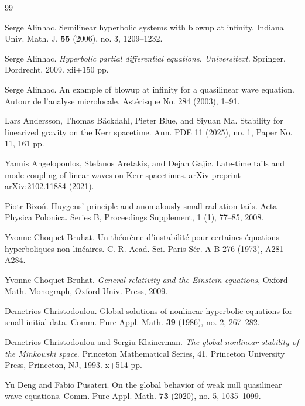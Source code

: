 \documentclass[a4paper,reqno]{amsart}
\theoremstyle{definition}
\numberwithin{equation}{section}
\begin{document}
\begin{thebibliography}{99}

 Serge Alinhac.
	Semilinear hyperbolic systems with blowup at infinity. 
	Indiana Univ. Math. J. \textbf{55} (2006), no. 3, 1209–1232.

 Serge Alinhac.
\emph{Hyperbolic partial differential equations. Universitext.}
Springer, Dordrecht, 2009. xii+150 pp. 

 Serge Alinhac.  
An example of blowup at infinity for a quasilinear wave equation. Autour de l'analyse microlocale. Astérisque No. 284 (2003), 1--91.

Lars Andersson, Thomas B{\"a}ckdahl, Pieter Blue, and Siyuan Ma.
 {Stability for linearized gravity on the {K}err spacetime}. Ann. PDE 11 (2025), no. 1, Paper No. 11, 161 pp.
  
Yannis Angelopoulos, Stefanos Aretakis, and Dejan Gajic. {Late-time tails
  and mode coupling of linear waves on {K}err spacetimes}. arXiv preprint
  arXiv:2102.11884 (2021).
  
Piotr Bizo\'{n}.
{Huygens’ principle and anomalously small radiation tails}.
Acta Physica Polonica. Series B, Proceedings Supplement, 1 (1), 77--85, 2008.

{ Yvonne Choquet-Bruhat}. Un th{\'e}or{\`e}me d’instabilit{\'e} pour certaines {\'e}quations hyperboliques non lin{\'e}aires. C. R. Acad. Sci. Paris S{\'e}r. A-B 276 (1973), A281–A284.

{ Yvonne Choquet-Bruhat}.
\emph{General relativity and the Einstein equations}, Oxford Math. Monograph,
Oxford Univ. Press, 2009.



 Demetrios Christodoulou. 
Global solutions of nonlinear hyperbolic equations for small initial data. 
Comm. Pure Appl. Math. \textbf{39} (1986), no. 2, 267--282.


 Demetrios Christodoulou and Sergiu Klainerman.  
\emph{The global nonlinear stability of the Minkowski space}. Princeton Mathematical Series, 41. Princeton University Press, Princeton, NJ, 1993. x+514 pp.

Yu Deng and Fabio Pusateri.  On the global behavior of weak null quasilinear wave equations. 
Comm. Pure Appl. Math. \textbf{73} (2020), no. 5, 1035--1099.



\end{thebibliography}
\end{document}
